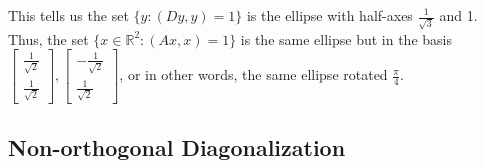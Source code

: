 \documentclass[a4paper,10pt]{book}
\newcommand{\R}{\mathbb{R}}
\theoremstyle{plain}
\theoremstyle{plain}
\theoremstyle{remark}
\theoremstyle{definition}
\begin{document}
This tells us the set $\{y : (Dy, y) = 1\}$ is the ellipse with half-axes $\frac{1}{\sqrt{3}}$ and 1. Thus, the set $\{x \in \R^{2}: (Ax, x) = 1 \}$ is the same ellipse but in the basis $\begin{bmatrix}
\frac{1}{\sqrt{2}} \\
\frac{1}{\sqrt{2}}
\end{bmatrix}, \begin{bmatrix}
-\frac{1}{\sqrt{2}} \\
\frac{1}{\sqrt{2}}
\end{bmatrix}$, or in other words, the same ellipse rotated $\frac{\pi}{4}$. 

\subsection{Non-orthogonal Diagonalization} 
\end{document}
